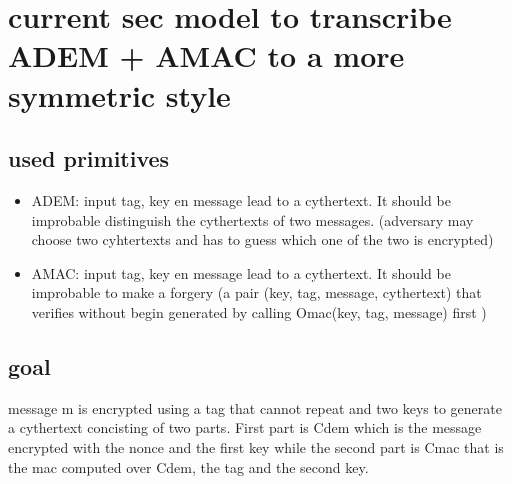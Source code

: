 \documentclass{article}
\begin{document}
\section{current sec model to transcribe ADEM + AMAC to a more symmetric style}
\subsection{used primitives}
\begin{itemize}
    \item ADEM: input tag, key en message lead to a cythertext. It should be improbable distinguish the cythertexts of two messages. (adversary may choose two cyhtertexts and has to guess which one of the two is encrypted)
    
    \item AMAC: input tag, key en message lead to a cythertext. It should be improbable to make a forgery (a pair (key, tag, message, cythertext) that verifies without begin generated by calling Omac(key, tag, message) first )
\end{itemize}

\subsection{goal}
message m is encrypted using a tag that cannot repeat and two keys to generate a cythertext concisting of two parts. First part is Cdem which is the message encrypted with the nonce and the first key while the second part is Cmac that is the mac computed over Cdem, the tag and the second key.
\end{document}
